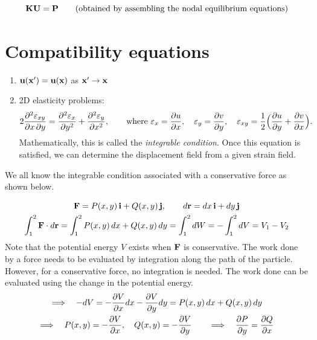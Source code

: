 \begin{equation*}
  \mathbf{K}\mathbf{U} = \mathbf{P} \qquad \text{(obtained by assembling the nodal equilibrium equations)}
\end{equation*}

\section{Compatibility equations}
\begin{enumerate}[label=e.g.\,\arabic*.,leftmargin=*]
  \item $\mathbf{u}(\mathbf{x}') = \mathbf{u}(\mathbf{x})$ as $\mathbf{x}'\to\mathbf{x}$
  \item 2D elasticity problems:
    \begin{equation}
      2\frac{\partial^2\varepsilon_{xy}}{\partial x\,\partial y} = \frac{\partial^2\varepsilon_x}{\partial y^2}+\frac{\partial^2\varepsilon_y}{\partial x^2},
      \qquad\text{where }
      \varepsilon_x = \frac{\partial u}{\partial x},\quad \varepsilon_y=\frac{\partial v}{\partial y},\quad \varepsilon_{xy} = \frac12\Bigl(\frac{\partial u}{\partial y}+\frac{\partial v}{\partial x}\Bigr).
    \end{equation}
    Mathematically, this is called the \emph{integrable condition}. Once this equation is satisfied, we can determine the displacement field from a given strain field.
\end{enumerate}

We all know the integrable condition associated with a conservative force as shown below.
\begin{fig}
  
\end{fig}
\begin{gather}
  \mathbf{F} = P(x,y)\,\mathbf{i} + Q(x,y)\,\mathbf{j}, \qquad d\mathbf{r} = dx\,\mathbf{i} + dy\,\mathbf{j} \\
  \int_1^2 \mathbf{F}\cdot d\mathbf{r} = \int_1^2 P(x,y)\,dx + Q(x,y)\,dy = \int_1^2 dW = -\int_1^2 dV = V_1 - V_2
\end{gather}
Note that the potential energy $V$ exists when $\mathbf{F}$ is conservative. The work done by a force needs to be evaluated by integration along the path of the particle. However, for a conservative force, no integration is needed. The work done can be evaluated using the change in the potential energy.
\begin{gather}
  \Longrightarrow\quad -dV = -\frac{\partial V}{\partial x}dx - \frac{\partial V}{\partial y}dy = P(x,y)\,dx + Q(x,y)\,dy \\
  \Longrightarrow\quad P(x,y) = -\frac{\partial V}{\partial x},\quad Q(x,y) = -\frac{\partial V}{\partial y}
  \qquad\Longrightarrow\quad \frac{\partial P}{\partial y} = \frac{\partial Q}{\partial x}
\end{gather}

